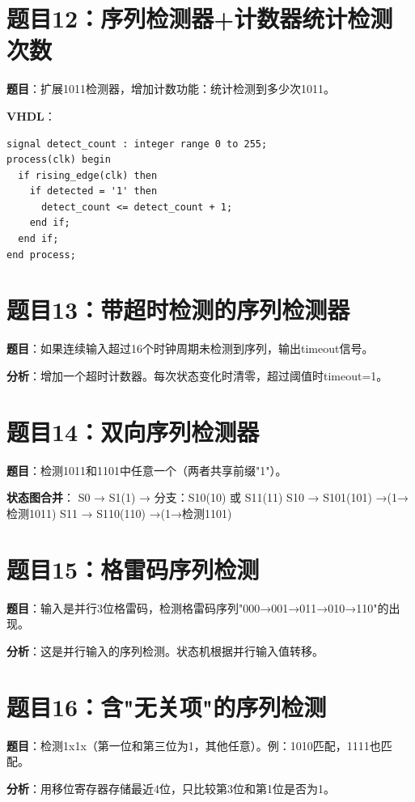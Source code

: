 \section*{题目12：序列检测器+计数器统计检测次数}

\textbf{题目}：扩展1011检测器，增加计数功能：统计检测到多少次1011。

\textbf{VHDL}：
\begin{lstlisting}
signal detect_count : integer range 0 to 255;
process(clk) begin
  if rising_edge(clk) then
    if detected = '1' then
      detect_count <= detect_count + 1;
    end if;
  end if;
end process;
\end{lstlisting}

\section*{题目13：带超时检测的序列检测器}

\textbf{题目}：如果连续输入超过16个时钟周期未检测到序列，输出timeout信号。

\textbf{分析}：增加一个超时计数器。每次状态变化时清零，超过阈值时timeout=1。

\section*{题目14：双向序列检测器}

\textbf{题目}：检测1011和1101中任意一个（两者共享前缀"1"）。

\textbf{状态图合并}：
S0 → S1(1) → 分支：S10(10) 或 S11(11)
S10 → S101(101) →(1→检测1011)
S11 → S110(110) →(1→检测1101)

\section*{题目15：格雷码序列检测}

\textbf{题目}：输入是并行3位格雷码，检测格雷码序列"000→001→011→010→110"的出现。

\textbf{分析}：这是并行输入的序列检测。状态机根据并行输入值转移。

\section*{题目16：含"无关项"的序列检测}

\textbf{题目}：检测1x1x（第一位和第三位为1，其他任意）。例：1010匹配，1111也匹配。

\textbf{分析}：用移位寄存器存储最近4位，只比较第3位和第1位是否为1。

